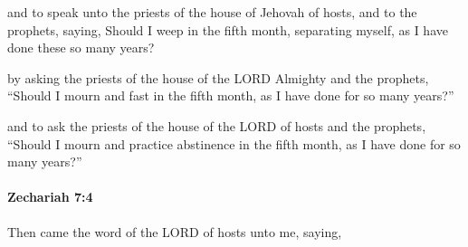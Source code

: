 			\begin{versebox}
					\item[BHS] 
					\item[LXX] 
					\item[ASV] and to speak unto the priests of the house of Jehovah of hosts, and to the prophets, saying, Should I weep in the fifth month, separating myself, as I have done these so many years?
					\item[NIV] by asking the priests of the house of the LORD Almighty and the prophets, “Should I mourn and fast in the fifth month, as I have done for so many years?”
					\item[NRSV] and to ask the priests of the house of the LORD of hosts and the prophets, “Should I mourn and practice abstinence in the fifth month, as I have done for so many years?”
			\end{versebox}

		\paragraph{Zechariah 7:4} %
			\label{ZECHARIAH-7-4}

			Then came the word of the LORD of hosts unto me, saying,

